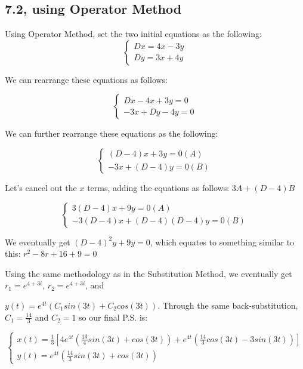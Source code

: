 \documentclass{article}
\begin{document}
\subsection{7.2, using Operator Method}

Using Operator Method, set the two initial equations as the following:
$$
\begin{cases}
Dx = 4x - 3y\\
Dy = 3x + 4y
\end{cases}
$$ 
\par
\noindent We can rearrange these equations as follows: \par
$$
\begin{cases}
Dx - 4x + 3y = 0\\
-3x + Dy - 4y = 0
\end{cases}
$$
\par\vspace{0.60cm}

\noindent We can further rearrange these equations as the following: \par
$$
\begin{cases}
(D - 4)x + 3y = 0 (A)\\
-3x + (D - 4)y = 0 (B)
\end{cases}
$$ \par\vspace{0.25cm}

\noindent Let's cancel out the $x$ terms, adding the equations as follows: $3A + (D - 4)B$ \par
\noindent $$
\begin{cases}
3(D - 4)x + 9y = 0 (A)\\
-3(D - 4)x + (D - 4)(D - 4)y = 0 (B)
\end{cases}
$$ \par
\noindent We eventually get $(D - 4)^{2}y + 9y = 0$, which equates to something similar to this: $r^{2} - 8r + 16 + 9 = 0$ \par\vspace{0.25cm}

\noindent Using the same methodology as in the Substitution Method, we eventually get $r_{1} = e^{4 + 3i}$, $r_{2} = e^{4 + 3i}$, and \par 
\noindent $y(t) = e^{4t}(C_{1}sin(3t) + C_{2}cos(3t))$.  Through the same back-substitution, $C_{1} = \frac{14}{3}$ and $C_{2} = 1$ so our final P.S. is: \par\vspace{0.25cm}

\noindent $$
\begin{cases}
x(t) = \frac{1}{3}[4e^{4t}(\frac{13}{4}sin(3t) + cos(3t)) + e^{4t}(\frac{14}{3}cos(3t) - 3sin(3t))]\\
y(t) = e^{4t}(\frac{14}{3}sin(3t) + cos(3t))
\end{cases}
$$ \par
\end{document}

